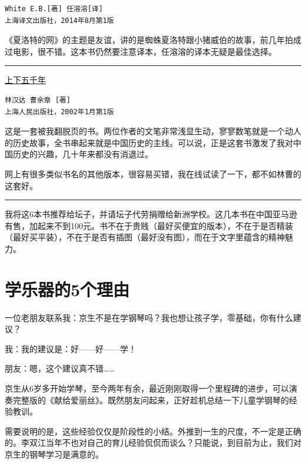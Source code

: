 \documentclass[twoside,openright,headings=optiontohead]{ctexbook} %
\begin{document}
{\begin{verbatim}
White E.B.[著] 任溶溶[译]
上海译文出版社，2014年8月第1版
\end{verbatim}

《夏洛特的网》的主题是友谊，讲的是蜘蛛夏洛特跟小猪威伯的故事，前几年拍成过电影，很不错。这本书仍然要注意译本，任溶溶的译本无疑是最佳选择。

\begin{center}\rule{0.5\linewidth}{\linethickness}\end{center}

\href{https://www.amazon.cn/gp/product/B002T1GVL0/ref=ox_sc_act_title_1?ie=UTF8\&psc=1\&smid=A1AJ19PSB66TGU}{上下五千年}

\begin{verbatim}
林汉达 曹余章 [著]
上海人民出版社，2002年1月第1版
\end{verbatim}

这是一套被我翻脱页的书。两位作者的文笔非常浅显生动，寥寥数笔就是一个动人的历史故事，全书串起来就是中国历史的主线。可以说，正是这套书激发了我对中国历史的兴趣，几十年来都没有消退过。

网上有很多类似书名的其他版本，很容易买错，我在线试读了一下，都不如林曹的这套好。

\begin{center}\rule{0.5\linewidth}{\linethickness}\end{center}

我将这6本书推荐给坛子，并请坛子代劳捐赠给新洲学校。这几本书在中国亚马逊有售，加起来不到100元。书不在于贵贱（最好买便宜的版本），不在于是否精装（最好买平装），不在于是否有插图（最好没有图），而在于文字里蕴含的精神魅力。

\chapter*{学乐器的5个理由}\label{why-learn-instruments}

一位老朋友联系我：京生不是在学钢琴吗？我也想让孩子学，零基础，你有什么建议？

我：我的建议是：好------好------学！

朋友：嗯，这个建议真不错\ldots{}\ldots{}

京生从6岁多开始学琴，至今两年有余，最近刚刚取得一个里程碑的进步，可以演奏完整版的《献给爱丽丝》。既然朋友问起来，正好趁机总结一下儿童学钢琴的经验教训。

需要说明的是，这些经验仅仅是阶段性的小结。外推到一生的尺度，不一定是正确的。李双江当年不也对自己的育儿经验侃侃而谈么？只能说，到目前为止，我们对京生的钢琴学习是满意的。

}
\end{document}
